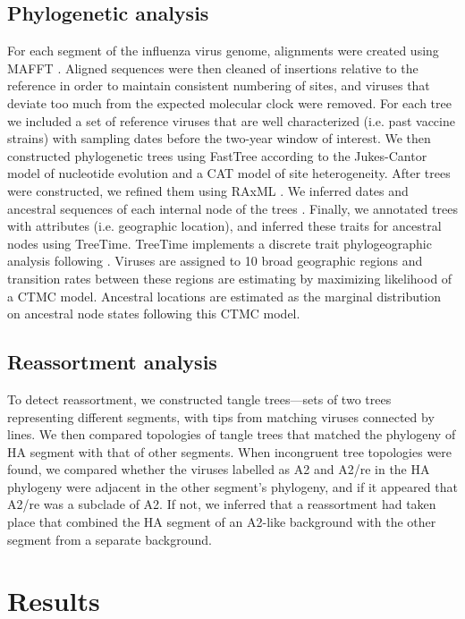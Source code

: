 \subsection*{Phylogenetic analysis}
For each segment of the influenza virus genome, alignments were created using MAFFT \citep{katoh_mafft_2013}.
Aligned sequences were then cleaned of insertions relative to the reference in order to maintain consistent numbering of sites, and viruses that deviate too much from the expected molecular clock were removed.
For each tree we included a set of reference viruses that are well characterized (i.e. past vaccine strains) with sampling dates before the two-year window of interest.
We then constructed phylogenetic trees using FastTree \citep{price_fasttree_2009} according to the Jukes-Cantor model of nucleotide evolution and a CAT model of site heterogeneity.
After trees were constructed, we refined them using RAxML \citep{stamatakis_raxml_2014}.
We inferred dates and ancestral sequences of each internal node of the trees \citep{Sagulenko2018}.
Finally, we annotated trees with attributes (i.e. geographic location), and inferred these traits for ancestral nodes using TreeTime.
TreeTime \citep{TreeTime} implements a discrete trait phylogeographic analysis following \citep{Lemey2009Bayesian}.
Viruses are assigned to 10 broad geographic regions and transition rates between these regions are estimating by maximizing likelihood of a CTMC model.
Ancestral locations are estimated as the marginal distribution on ancestral node states following this CTMC model.

\subsection*{Reassortment analysis}
To detect reassortment, we constructed tangle trees—sets of two trees representing different segments, with tips from matching viruses connected by lines.
We then compared topologies of tangle trees that matched the phylogeny of HA segment with that of other segments.
When incongruent tree topologies were found, we compared whether the viruses labelled as A2 and A2/re in the HA phylogeny were adjacent in the other segment's phylogeny, and if it appeared that A2/re was a subclade of A2.
If not, we inferred that a reassortment had taken place that combined the HA segment of an A2-like background with the other segment from a separate background.

\section*{Results}
